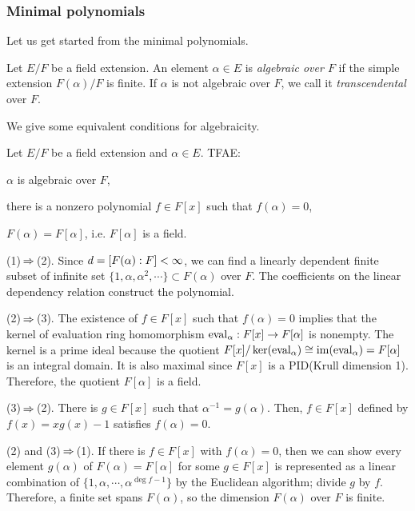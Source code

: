 \documentclass{../exp}
\begin{document}
\subsubsection{Minimal polynomials}
Let us get started from the minimal polynomials.

\begin{defn}
Let $E/F$ be a field extension.
An element $\alpha\in E$ is \emph{algebraic over $F$} if the simple extension $F(\alpha)/F$ is finite.
If $\alpha$ is not algebraic over $F$, we call it \emph{transcendental} over $F$.
\end{defn}

We give some equivalent conditions for algebraicity.
\begin{thm}
Let $E/F$ be a field extension and $\alpha\in E$.
TFAE:
\begin{cond}
\item $\alpha$ is algebraic over $F$,
\item there is a nonzero polynomial $f\in F[x]$ such that $f(\alpha)=0$,
\item $F(\alpha)=F[\alpha]$, i.e. $F[\alpha]$ is a field.
\end{cond}
\end{thm}
\begin{pf}
(1)$\impl$(2).
Since $d=[F(\alpha):F]<\infty$, we can find a linearly dependent finite subset of infinite set $\{1,\alpha,\alpha^2,\cdots\}\subset F(\alpha)$ over $F$.
The coefficients on the linear dependency relation construct the polynomial.

(2)$\impl$(3).
The existence of $f\in F[x]$ such that $f(\alpha)=0$ implies that the kernel of evaluation ring homomorphism $\eval_\alpha:F[x]\to F[\alpha]$ is nonempty.
The kernel is a prime ideal because the quotient $F[x]/\ker(\operatorname{eval}_\alpha)\cong\operatorname{im}(\operatorname{eval}_\alpha)=F[\alpha]$ is an integral domain.
It is also maximal since $F[x]$ is a PID(Krull dimension 1).
Therefore, the quotient $F[\alpha]$ is a field.

(3)$\impl$(2).
There is $g\in F[x]$ such that $\alpha^{-1}=g(\alpha)$.
Then, $f\in F[x]$ defined by $f(x)=xg(x)-1$ satisfies $f(\alpha)=0$.

(2) and (3)$\impl$(1).
If there is $f\in F[x]$ with $f(\alpha)=0$, then we can show every element $g(\alpha)$ of $F(\alpha)=F[\alpha]$ for some $g\in F[x]$ is represented as a linear combination of $\{1,\alpha,\cdots,\alpha^{\deg f-1}\}$ by the Euclidean algorithm; divide $g$ by $f$.
Therefore, a finite set spans $F(\alpha)$, so the dimension $F(\alpha)$ over $F$ is finite.
\end{pf}
\end{document}
